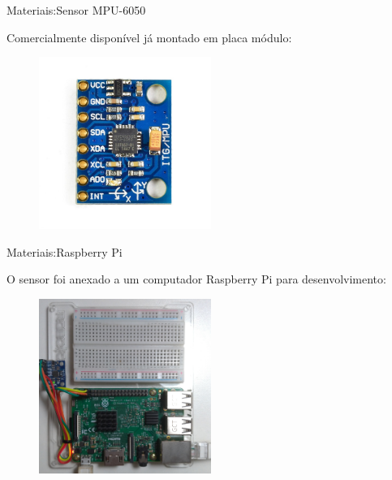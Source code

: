 \documentclass{beamer}
\begin{document}
\begin{frame}{Materiais:Sensor MPU-6050}

    Comercialmente disponível já montado em placa módulo:

    \begin{figure}[H]
        \centering
        \includegraphics[width=0.5\textwidth]{figuras/mpu6050-board-top.jpg}
    \end{figure}

\end{frame}

\begin{frame}{Materiais:Raspberry Pi}

    O sensor foi anexado a um computador Raspberry Pi para desenvolvimento:
    \begin{figure}[H]
        \centering
        \includegraphics[width=0.5\textwidth]{figuras/mpu6050-proto-top.jpg}
    \end{figure}

\end{frame}
\end{document}

